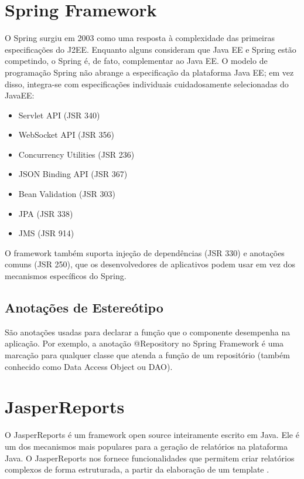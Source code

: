 \section{Spring Framework}
\label{sec:embasamentoTeoricoSpring}

O Spring surgiu em 2003 como uma resposta à complexidade das primeiras especificações do J2EE. Enquanto alguns consideram que Java EE e Spring estão competindo, o Spring é, de fato, complementar ao Java EE. O modelo de programação Spring não abrange a especificação da plataforma Java EE; em vez disso, integra-se com especificações individuais cuidadosamente selecionadas do JavaEE:

\begin{itemize}
    \item Servlet API (JSR 340)
    \item WebSocket API (JSR 356)
    \item Concurrency Utilities (JSR 236)
    \item JSON Binding API (JSR 367)
    \item Bean Validation (JSR 303)
    \item JPA (JSR 338)
    \item JMS (JSR 914)
\end{itemize}

O framework também suporta injeção de dependências (JSR 330)  e anotações comuns (JSR 250), que os desenvolvedores de aplicativos podem usar em vez dos mecanismos específicos do Spring.

\subsection{Anotações de Estereótipo}
São anotações usadas para declarar a função que o componente desempenha na aplicação. Por exemplo, a anotação @Repository no Spring Framework é uma marcação para qualquer classe que atenda a função de um repositório (também conhecido como Data Access Object ou DAO).

\section{JasperReports}
\label{sec:embasamentoTeoricoJasper}

O JasperReports é um framework open source inteiramente escrito em Java. Ele é um dos mecanismos mais populares para a geração de relatórios na plataforma Java.
O JasperReports nos fornece funcionalidades que permitem criar relatórios complexos de forma estruturada, a partir da elaboração de um template \cite{Devmedia2012}.

